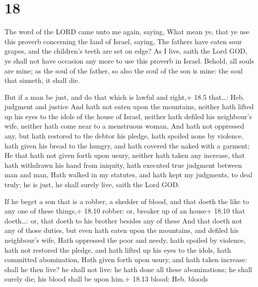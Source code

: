 \hypertarget{section-17}{%
\section{18}\label{section-17}}

 The word of the LORD came unto me again, saying,
 What mean ye, that ye use this proverb concerning the land
of Israel, saying, The fathers have eaten sour grapes, and the
children's teeth are set on edge?  As I live, saith the Lord
GOD, ye shall not have occasion any more to use this proverb in Israel.
 Behold, all souls are mine; as the soul of the father, so
also the soul of the son is mine: the soul that sinneth, it shall die.

 But if a man be just, and do that which is lawful and
right,+ 18.5 that\ldots: Heb. judgment and justice  And hath
not eaten upon the mountains, neither hath lifted up his eyes to the
idols of the house of Israel, neither hath defiled his neighbour's wife,
neither hath come near to a menstruous woman,  And hath not
oppressed any, but hath restored to the debtor his pledge, hath spoiled
none by violence, hath given his bread to the hungry, and hath covered
the naked with a garment;  He that hath not given forth upon
usury, neither hath taken any increase, that hath withdrawn his hand
from iniquity, hath executed true judgment between man and man,
 Hath walked in my statutes, and hath kept my judgments, to
deal truly; he is just, he shall surely live, saith the Lord GOD.

 If he beget a son that is a robber, a shedder of blood,
and that doeth the like to any one of these things,+ 18.10 robber: or,
breaker up of an house+ 18.10 that doeth\ldots: or, that doeth to his
brother besides any of these  And that doeth not any of
those duties, but even hath eaten upon the mountains, and defiled his
neighbour's wife,  Hath oppressed the poor and needy, hath
spoiled by violence, hath not restored the pledge, and hath lifted up
his eyes to the idols, hath committed abomination,  Hath
given forth upon usury, and hath taken increase: shall he then live? he
shall not live: he hath done all these abominations; he shall surely
die; his blood shall be upon him.+ 18.13 blood: Heb. bloods

